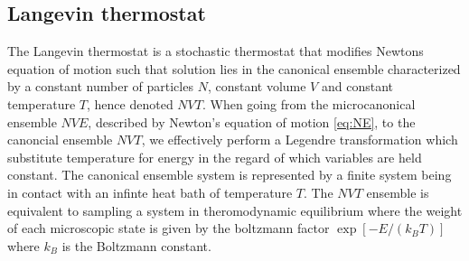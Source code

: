 \subsection{Langevin thermostat} \label{sec:langevin}




The Langevin thermostat is a stochastic thermostat that modifies Newtons
equation of motion such that solution lies in the canonical ensemble
characterized by a constant number of particles $N$, constant volume $V$ and
constant temperature $T$, hence denoted $NVT$. When going from the microcanonical ensemble $NVE$, described by Newton's equation of motion \cref{eq:NE}, to the canoncial ensemble $NVT$, we effectively perform a Legendre transformation which substitute temperature for energy in the regard of which variables are held constant. The canonical ensemble system is represented by a finite system being in contact with an infinte heat bath of temperature $T$. The $NVT$ ensemble is equivalent to sampling a system in theromodynamic equilibrium where the weight of each microscopic state is given by the boltzmann factor $\exp[-E/(k_B T)]$ where $k_B$ is the Boltzmann constant. 

